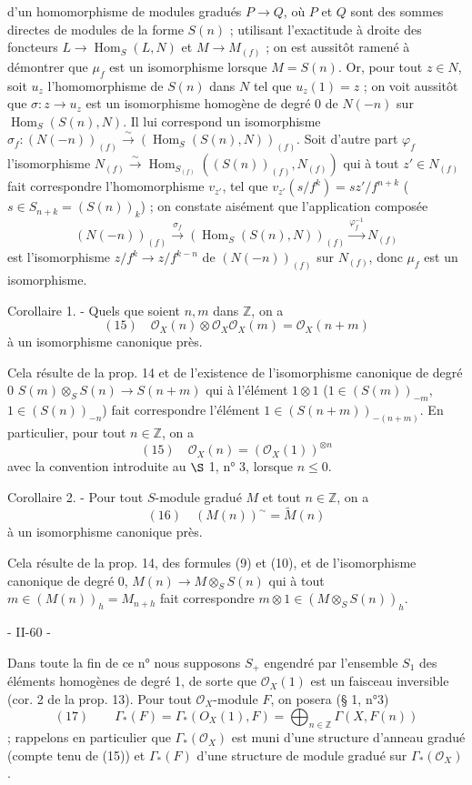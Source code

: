 d'un homomorphisme de modules gradués $P \to Q$, où $P$ et $Q$ sont des sommes directes de modules de la forme $S(n)$ ; utilisant l'exactitude à droite des foncteurs $L \to \operatorname{Hom}_S(L, N)$ et $M \to M_{(f)}$ ; on est aussitôt ramené à démontrer que $\mu_f$ est un isomorphisme lorsque $M=S(n)$. Or, pour tout $z \in N$, soit $u_z$ l'homomorphisme de $S(n)$ dans $N$ tel que $u_z(1)=z$ ; on voit aussitôt que $\sigma : z \to u_z$ est un isomorphisme homogène de degré 0 de $N(-n)$ sur $\operatorname{Hom}_S(S(n), N)$. Il lui correspond un isomorphisme $\sigma_f : (N(-n))_{(f)} \xrightarrow{\sim} (\operatorname{Hom}_S(S(n), N))_{(f)}$.
Soit d'autre part $\varphi_f$ l'isomorphisme $N_{(f)} \xrightarrow{\sim} \operatorname{Hom}_{S_{(f)}}((S(n))_{(f)}, N_{(f)})$ qui à tout $z' \in N_{(f)}$ fait correspondre l'homomorphisme $v_{z'}$, tel que $v_{z'}(s/f^k) = sz'/f^{n+k}$ ($s \in S_{n+k} = (S(n))_k$) ; on constate aisément que l'application composée
$$(N(-n))_{(f)} \xrightarrow{\sigma_f} (\operatorname{Hom}_S(S(n), N))_{(f)} \xrightarrow{\varphi_f^{-1}} N_{(f)}$$
est l'isomorphisme $z/f^k \to z/f^{k-n}$ de $(N(-n))_{(f)}$ sur $N_{(f)}$, donc $\mu_f$ est un isomorphisme.

Corollaire 1. - Quels que soient $n, m$ dans $\mathbb{Z}$, on a
$$(15) \quad \mathcal{O}_X(n) \otimes \mathcal{O}_X \mathcal{O}_X(m) = \mathcal{O}_X(n+m)$$
à un isomorphisme canonique près.

Cela résulte de la prop. 14 et de l'existence de l'isomorphisme canonique de degré 0 $S(m) \otimes_S S(n) \to S(n+m)$ qui à l'élément $1 \otimes 1$ ($1 \in (S(m))_{-m}$, $1 \in (S(n))_{-n}$) fait correspondre l'élément $1 \in (S(n+m))_{-(n+m)}$.
En particulier, pour tout $n \in \mathbb{Z}$, on a
$$(15) \quad \mathcal{O}_X(n) = (\mathcal{O}_X(1))^{\otimes n}$$
avec la convention introduite au $\S$ 1, n° 3, lorsque $n \leq 0$.

Corollaire 2. - Pour tout $S$-module gradué $M$ et tout $n \in \mathbb{Z}$, on a
$$(16) \quad (M(n))^{\sim} = \tilde{M}(n)$$
à un isomorphisme canonique près.

Cela résulte de la prop. 14, des formules (9) et (10), et de l'isomorphisme canonique de degré 0, $M(n) \to M \otimes_S S(n)$ qui à tout $m \in (M(n))_h = M_{n+h}$ fait correspondre $m \otimes 1 \in (M \otimes_S S(n))_h$.

\newpage


- II-60 -

Dans toute la fin de ce n° nous supposons $S_+$ engendré par l'ensemble $S_1$ des éléments homogènes de degré 1, de sorte que $\mathcal{O}_X(1)$ est un faisceau inversible (cor. 2 de la prop. 13). Pour tout $\mathcal{O}_X$-module $F$, on posera (§ 1, n°3)
$$(17) \qquad \Gamma_*(F) = \Gamma_*(O_X(1), F) = \bigoplus_{n \in \mathbb{Z}} \Gamma(X, F(n))$$;
rappelons en particulier que $\Gamma_*(\mathcal{O}_X)$ est muni d'une structure d'anneau gradué (compte tenu de (15)) et $\Gamma_*(F)$ d'une structure de module gradué sur $\Gamma_*(\mathcal{O}_X)$.

